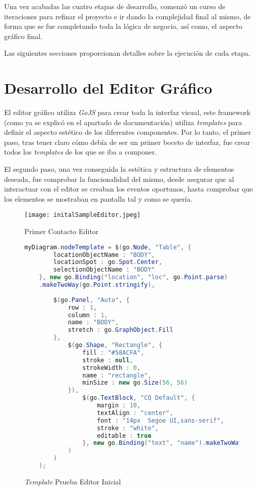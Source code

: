 Una vez acabadas las cuatro etapas de desarrollo, comenzó un curso de iteraciones para refinar el proyecto e ir dando la complejidad final al mismo, de forma que se fue completando toda la lógica de negocio, así como, el aspecto gráfico final.

Las siguientes secciones proporcionan detalles sobre la ejecución de cada etapa.

\section{Desarrollo del Editor Gráfico}

El editor gráfico utiliza \emph{GoJS} para crear toda la interfaz visual, este framework (como ya se explicó en el apartado de documentación) utiliza \emph{templates} para definir el aspecto estético de los diferentes componentes. Por lo tanto, el primer paso, tras tener claro cómo debía de ser un primer boceto de interfaz, fue crear todos los \emph{templates} de los que se iba a componer.

El segundo paso, una vez conseguida la estética y estructura de elementos deseada, fue comprobar la funcionalidad del mismo, desde asegurar que al interactuar con el editor se creaban los eventos oportunos, hasta comprobar que los elementos se mostraban en pantalla tal y como se quería.

\begin{figure}[!tb]
	\centering
	\texttt{[image: initalSampleEditor.jpeg]}
	\caption{Primer Contacto Editor}
	\label{fig:initialSampleEditor}
\end{figure}

\begin{figure}[!tb]
	\centering
	\begin{lstlisting}[language=Java]
	myDiagram.nodeTemplate = $(go.Node, "Table", {
		locationObjectName : "BODY",
		locationSpot : go.Spot.Center,
		selectionObjectName : "BODY"
	}, new go.Binding("location", "loc", go.Point.parse)
	.makeTwoWay(go.Point.stringify),
	
		$(go.Panel, "Auto", {
			row : 1,
			column : 1,
			name : "BODY",
			stretch : go.GraphObject.Fill
		}, 
			$(go.Shape, "Rectangle", {
				fill : "#58ACFA",
				stroke : null,
				strokeWidth : 0,
				name : "rectangle",
				minSize : new go.Size(56, 56)
			}), 
				$(go.TextBlock, "CQ Default", {
					margin : 10,
					textAlign : "center",
					font : "14px  Segoe UI,sans-serif",
					stroke : "white",
					editable : true
				}, new go.Binding("text", "name").makeTwoWay()
			)
		)
	);\end{lstlisting}
	\caption{\emph{Template} Prueba Editor Inicial}
	\label{fig:initialSampleEditorCode}
\end{figure}

